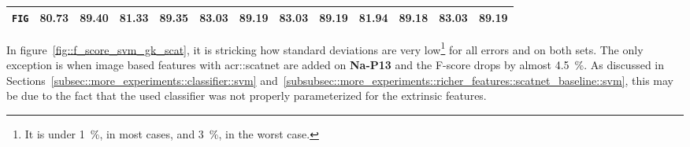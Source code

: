 \begin{sidewaystable}[htpb]
\begin{tabular}{| c | c c | c c | c c | c c | c c | c c |}
                \hline
                \texttt{FIG} & 80.73 & 89.40 & 81.33 & 89.35 & \textbf{83.03} & \textbf{89.19} & \textbf{83.03} & \textbf{89.19} & 81.94 & 89.18 & \textbf{83.03} & \textbf{89.19} \\
                \hline
            \end{tabular}
            \caption{
                \label{tab::stats_gk_scat_svm_f3}
                \gls{acr::svm} results using graph kernels and \glspl{acr::scatnet}, expressed in percentage, on the two datasets at \textbf{\gls{acr::efin}} level 3.
            }
        \end{sidewaystable}

        In figure~\ref{fig::f_score_svm_gk_scat}, it is stricking how standard deviations are very low\footnote{
            It is under \SI{1}{\percent}, in most cases, and \SI{3}{\percent}, in the worst case.
        } for all errors and on both sets.
        The only exception is when image based features with \gls{acr::scatnet} are added on \textbf{Na-P13} and the F-score drops by almost \SI{4.5}{\percent}.
        As discussed in Sections~\ref{subsec::more_experiments::classifier::svm} and~\ref{subsubsec::more_experiments::richer_features::scatnet_baseline::svm}, this may be due to the fact that the used classifier was not properly parameterized for the extrinsic features.\\

